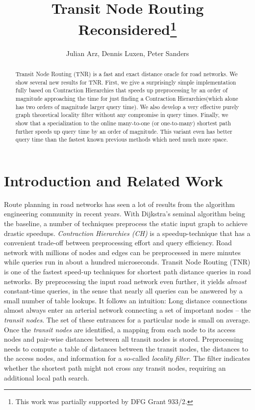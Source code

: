 \documentclass{llncs}
\title{Transit Node Routing Reconsidered\thanks{This work was partially supported by DFG Grant 933/2.}}
\author{Julian Arz, Dennis Luxen, Peter Sanders}
\institute{Karlsruhe Institute of Technology (KIT), 76128 Karlsruhe, Germany\\
 \email{\small julian.arz@student.kit.edu, \{luxen,sanders\}@kit.edu}
}
\date{}
\newcommand{\ch}{Contraction Hierarchies\xspace}
\begin{document}
\maketitle

\begin{abstract}
Transit Node Routing (TNR) is a fast and exact distance oracle for road networks. We show several new results for TNR. First, we give a surprisingly simple implementation fully based on \ch that speeds up preprocessing by an order of magnitude approaching the time for just finding a \ch (which alone has two orders of magnitude larger query time). We also develop a very effective purely graph theoretical locality filter without any compromise in query times. Finally, we show that a specialization to the online many-to-one (or one-to-many) shortest path further speeds up query time by an order of magnitude. This variant even has better query time than
the fastest known previous methods which need much more space. 
\end{abstract}
\section{Introduction and Related Work}\label{sec:tnr-related}
Route planning in road networks has seen a lot of results from the algorithm engineering community in recent years.
With Dijkstra's seminal algorithm being the baseline, a number of techniques  preprocess the static input graph to achieve drastic speedups.
\textit{Contraction Hierarchies (CH)} \cite{gssd-chfsh-08,gssv-erlrn-12} is a speedup-technique that has a convenient trade-off between preprocessing effort and query efficiency.
Road network with millions of nodes and edges can be preprocessed in mere minutes while queries run in about a hundred microseconds.
Transit Node Routing (TNR) \cite{bfss-frrnt-07} is one of the fastest speed-up techniques for shortest path distance queries in road networks. 
By preprocessing the input road network even further, it yields \textit{almost} constant-time queries, in the sense that nearly all queries can be answered by a small number of table lookups.
It follows an intuition:
Long distance connections almost always enter an arterial network connecting a set of important nodes -- the \textit{transit nodes}.
The set of these entrances for a particular node is small on average. 
Once the \emph{transit nodes} are identified, a mapping from each node to its access nodes and pair-wise distances between all transit nodes is stored.
Preprocessing needs to compute a table of distances between the transit nodes, the distances to the access nodes, and information for a so-called \emph{locality filter}.
The filter indicates whether the shortest path might not cross any transit nodes, requiring an additional local path search. 
\end{document}
